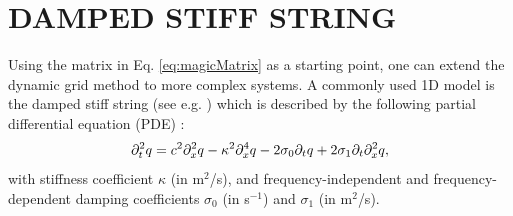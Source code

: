 \documentclass[fleqn]{jaes}
\begin{document}

\section{DAMPED STIFF STRING}\label{sec:stiffString}
Using the matrix in Eq. \eqref{eq:magicMatrix} as a starting point, one can extend the dynamic grid method to more complex systems. A commonly used 1D model is the damped stiff string (see e.g. \cite{Willemsen2019}) which is described by the following partial differential equation (PDE) \cite{Bensa2003}:
\begin{equation}\label{eq:stiffString}
    \ptt q = c^2 \pxx q - \kappa^2 \pxxxx q - 2\sigma_0\pt q + 2\sigma_1\pt\pxx q,
\end{equation} 
with stiffness coefficient $\kappa$ (in m$^2$/s), and frequency-independent and frequency-dependent damping coefficients $\sigma_0$ (in s$^{-1}$) and $\sigma_1$ (in m$^2$/s).
\end{document}
